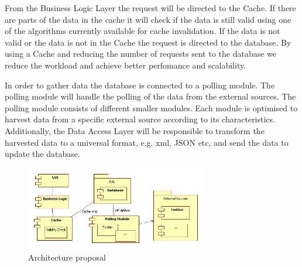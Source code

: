 \documentclass{article}
\begin{document}
From the Business Logic Layer the request will be directed to the
Cache. If there are parts of the data in the cache it will check if the data is
still valid using one of the algorithms currently available for cache
invalidation. If the data is not valid or the data is not in the Cache the
request is directed to the database. By using a Cache and reducing the number
of requests sent to the database we reduce the workload and achieve better
perfomance and scalability.

In order to gather data the database is connected to a polling module. The
polling module will handle the polling of the data from the external sources.
The polling module consists of different smaller modules. Each module is
optimised to harvest data from a specific external source according to its
characteristics. Additionally, the Data Access Layer will be responsible to transform the
harvested data to a universal format, e.g. xml, JSON etc, and send the data to
update the database.

\begin{figure}[!]
\centering
\includegraphics[width=300px]{ProposedSolution}
\caption{Architecture proposal}
\label{fig:fig6}
\end{figure}


\newpage

\nocite{*}


\end{document}
